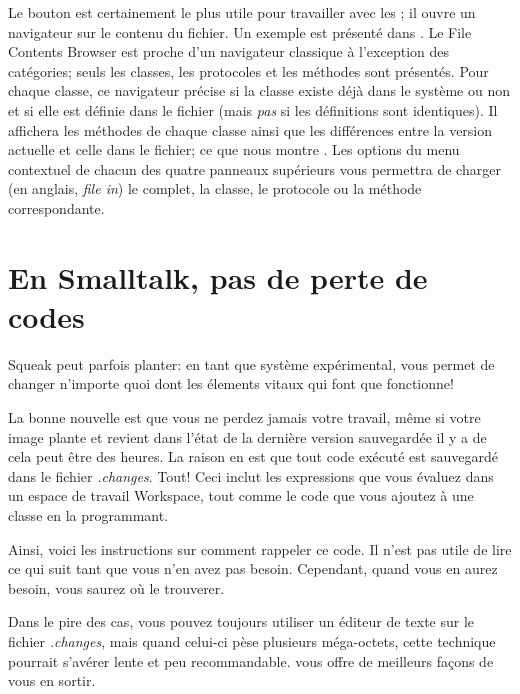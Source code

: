 \documentclass[a4paper,10pt,twoside]{book}
\begin{document}
Le bouton  est certainement le plus utile pour travailler avec les \changesets;
il ouvre un navigateur sur le contenu du fichier. Un exemple est pr\'esent\'e dans
.
Le File Contents Browser est proche d'un navigateur classique \`a l'exception
des cat\'egories; seuls les classes, les protocoles et les m\'ethodes sont pr\'esent\'es.
Pour chaque classe, ce navigateur pr\'ecise si la classe existe d\'ej\`a dans
le syst\`eme ou non et si elle est d\'efinie dans le fichier (mais \emph{pas} si
les d\'efinitions sont identiques).
Il affichera les m\'ethodes de chaque classe
ainsi que les diff\'erences entre la version actuelle et celle dans le fichier; ce que
nous montre .
Les options du menu contextuel de chacun des quatre panneaux sup\'erieurs vous
permettra de charger (en anglais, \emph{file in}) le \changeset complet, la classe, 
le protocole ou la m\'ethode correspondante.

\section{En Smalltalk, pas de perte de codes}
\label{sec:cantLoseCode} %

Squeak peut parfois planter: en tant que syst\`eme exp\'erimental, \sq vous permet
de changer n'importe quoi dont les \'elements vitaux qui font que \sq fonctionne!


La bonne nouvelle est que vous ne perdez jamais votre travail, m\^eme si votre 
image plante et revient dans l'\'etat de la derni\`ere version sauvegard\'ee il y 
a de cela peut \^etre des heures.
La raison en est que tout code ex\'ecut\'e est sauvegard\'e dans le fichier
\emph{.changes}.
Tout!
Ceci inclut les expressions que vous \'evaluez dans un espace de travail Workspace,
tout comme le code que vous ajoutez \`a une classe en la programmant.

Ainsi, voici les instructions sur comment rappeler ce code.
Il n'est pas utile de lire ce qui suit tant que vous n'en avez pas besoin.
Cependant, quand vous en aurez besoin, vous saurez o\`u le trouverer.

Dans le pire des cas, vous pouvez toujours utiliser un \'editeur de texte
sur le fichier \emph{.changes}, mais quand celui-ci p\`ese plusieurs m\'ega-octets,
cette technique pourrait s'av\'erer lente et peu recommandable.
\sq vous offre de meilleurs fa\c{c}ons 
de vous en sortir.
\end{document}
